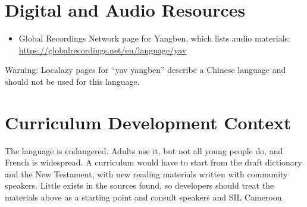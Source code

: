 \documentclass[12pt]{article}
\begin{document}
\section{Digital and Audio Resources}
\begin{itemize}
\item Global Recordings Network page for Yangben, which lists audio materials: \url{https://globalrecordings.net/en/language/yav}
\end{itemize}
Warning: Localazy pages for ``yav yangben'' describe a Chinese language and should not be used for this language.

\section{Curriculum Development Context}
The language is endangered. Adults use it, but not all young people do, and French is widespread. A curriculum would have to start from the draft dictionary and the New Testament, with new reading materials written with community speakers. Little exists in the sources found, so developers should treat the materials above as a starting point and consult speakers and SIL Cameroon.
\end{document}
